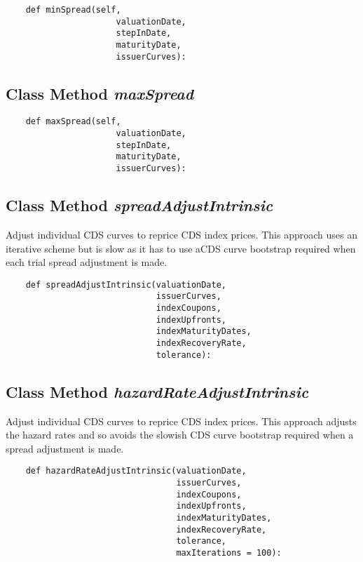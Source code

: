 \documentclass[twoside,11pt]{book}
\begin{document}
\begin{lstlisting}
    def minSpread(self, 
                      valuationDate,
                      stepInDate,
                      maturityDate,
                      issuerCurves):
\end{lstlisting}

\subsection{Class Method {\it maxSpread}}


\begin{lstlisting}
    def maxSpread(self, 
                      valuationDate,
                      stepInDate,
                      maturityDate,
                      issuerCurves):
\end{lstlisting}

\subsection{Class Method {\it spreadAdjustIntrinsic}}
Adjust individual CDS curves to reprice CDS index prices. This approach uses an iterative scheme but is slow as it has to use aCDS curve bootstrap required when each trial spread adjustment is made.

\begin{lstlisting}
    def spreadAdjustIntrinsic(valuationDate,
                              issuerCurves,
                              indexCoupons,
                              indexUpfronts,
                              indexMaturityDates,
                              indexRecoveryRate,
                              tolerance):
\end{lstlisting}

\subsection{Class Method {\it hazardRateAdjustIntrinsic}}
Adjust individual CDS curves to reprice CDS index prices. This approach adjusts the hazard rates and so avoids the slowish CDS curve bootstrap required when a spread adjustment is made.

\begin{lstlisting}
    def hazardRateAdjustIntrinsic(valuationDate, 
                                  issuerCurves,
                                  indexCoupons,
                                  indexUpfronts,
                                  indexMaturityDates,
                                  indexRecoveryRate,
                                  tolerance,
                                  maxIterations = 100):
\end{lstlisting}
\end{document}
